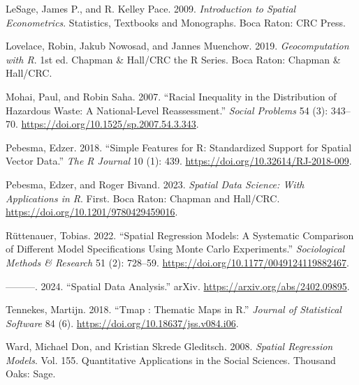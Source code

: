 \documentclass[
  letterpaper,
  DIV=11,
  numbers=noendperiod]{scrreprt}
\newlength{\cslhangindent}
\newlength{\cslentryspacingunit} %
\newenvironment{CSLReferences}[2] %
 {%
  \setlength{\parindent}{0pt}
  \ifodd #1
  \let\oldpar\par
  \def\par{\hangindent=\cslhangindent\oldpar}
  \fi
  \setlength{\parskip}{#2\cslentryspacingunit}
 }%
 {}
\begin{document}
\begin{CSLReferences}{1}{0}
\leavevmode{}%
LeSage, James P., and R. Kelley Pace. 2009. \emph{Introduction to
{Spatial Econometrics}}. Statistics, {Textbooks} and {Monographs}. {Boca
Raton}: {CRC Press}.

\leavevmode{}%
Lovelace, Robin, Jakub Nowosad, and Jannes Muenchow. 2019.
\emph{Geocomputation with {R}}. 1st ed. Chapman \& {Hall}/{CRC} the {R}
Series. {Boca Raton}: {Chapman \& Hall/CRC}.

\leavevmode{}%
Mohai, Paul, and Robin Saha. 2007. {``Racial {Inequality} in the
{Distribution} of {Hazardous Waste}: {A National-Level Reassessment}.''}
\emph{Social Problems} 54 (3): 343--70.
\url{https://doi.org/10.1525/sp.2007.54.3.343}.

\leavevmode{}%
Pebesma, Edzer. 2018. {``Simple Features for {R}: {Standardized} Support
for Spatial Vector Data.''} \emph{The R Journal} 10 (1): 439.
\url{https://doi.org/10.32614/RJ-2018-009}.

\leavevmode{}%
Pebesma, Edzer, and Roger Bivand. 2023. \emph{Spatial {Data Science}:
{With Applications} in {R}}. First. {Boca Raton}: {Chapman and
Hall/CRC}. \url{https://doi.org/10.1201/9780429459016}.

\leavevmode{}%
Rüttenauer, Tobias. 2022. {``Spatial {Regression Models}: {A Systematic
Comparison} of {Different Model Specifications Using Monte Carlo
Experiments}.''} \emph{Sociological Methods \& Research} 51 (2):
728--59. \url{https://doi.org/10.1177/0049124119882467}.

\leavevmode{}%
---------. 2024. {``Spatial {Data Analysis}.''} {arXiv}.
\url{https://arxiv.org/abs/2402.09895}.

\leavevmode{}%
Tennekes, Martijn. 2018. {``Tmap : {Thematic Maps} in {R}.''}
\emph{Journal of Statistical Software} 84 (6).
\url{https://doi.org/10.18637/jss.v084.i06}.

\leavevmode{}%
Ward, Michael Don, and Kristian Skrede Gleditsch. 2008. \emph{Spatial
{Regression Models}}. Vol. 155. Quantitative {Applications} in the
{Social Sciences}. {Thousand Oaks}: {Sage}.

\end{CSLReferences}
\end{document}
